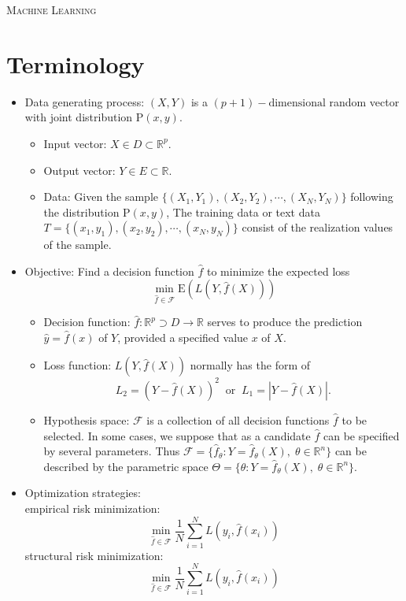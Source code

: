\documentclass{article}
\theoremstyle{nonumberplain}
\begin{document}
	\begin{center}
	\textsc{\Huge Machine Learning}	
\end{center}
\vspace{1em} 

\section{Terminology}

\begin{itemize}
	\item Data generating process: $(X,Y)$ is a $(p+1)-\text{dimensional}$ random vector with joint distribution $\mathrm{P}(x,y)$.
	\begin{itemize}
		\item Input vector: $X\in D\subset\mathbb{R}^p$.
		\item Output vector: $Y\in E\subset\mathbb{R}$.
		\item Data: Given the sample $\{(X_1,Y_1),(X_2,Y_2),\cdots,(X_N,Y_N)\}$ following the distribution $\mathrm{P}(x,y)$, The training data or text data $T=\{(x_1,y_1),(x_2,y_2),\cdots,(x_N,y_N)\}$ consist of the realization values of the sample.
	\end{itemize}	
	\item Objective: Find a decision function $\hat{f}$ to minimize the expected loss
	\[
	\min_{\hat{f}\in\mathcal{F}}\mathrm{E}(L(Y,\hat{f}(X)))
	\]
	\begin{itemize}
		\item Decision function: $\hat{f}:\mathbb{R}^p\supset D\longrightarrow\mathbb{R}$ serves to produce the prediction $\hat{y}=\hat{f}(x)$ of $Y$, provided a specified value $x$ of $X$. 
		\item Loss function: $L(Y,\hat{f}(X))$ normally has the form of 
		\[
		L_2=(Y-\hat{f}(X))^2\ \text{ or }\ L_1=|Y-\hat{f}(X)|.
		\]
		\item Hypothesis space: $\mathcal{F}$ is a collection of all decision functions $\hat{f}$ to be selected. In some cases, we suppose that as a candidate $\hat{f}$ can be specified by several parameters. Thus $\mathcal{F}=\{\hat{f}_\theta:Y=\hat{f}_\theta(X),\;\theta\in\mathbb{R}^n\}$ can be described by the parametric space $\Theta=\{\theta:Y=\hat{f}_\theta(X),\;\theta\in\mathbb{R}^n\}$.
	\end{itemize}
	\item Optimization strategies: \\
	empirical risk minimization:
	\[
	\min_{\hat{f}\in\mathcal{F}}\frac{1}{N}\sum_{i=1}^{N}L(y_i,\hat{f}(x_i))
	\]
	structural risk minimization:
	\[
	\min_{\hat{f}\in\mathcal{F}}\frac{1}{N}\sum_{i=1}^{N}L(y_i,\hat{f}(x_i))
	\]
\end{itemize} 
\end{document}
